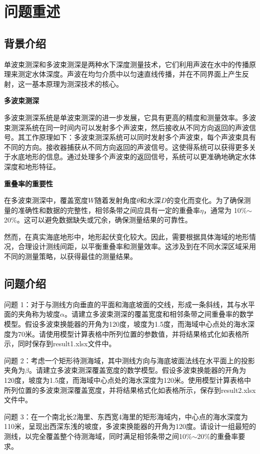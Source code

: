 \documentclass[12pt,a4paper]{article}
\begin{document}
	
	\section{问题重述}
\subsection{背景介绍}
	单波束测深和多波束测深是两种水下深度测量技术，它们利用声波在水中的传播原理来测定水体深度。声波在均匀介质中以匀速直线传播，并在不同界面上产生反射，这一基本原理为测深技术的核心。
	
	\noindent\textbf{多波束测深}
	
	多波束测深系统是单波束测深的进一步发展，它具有更高的精度和测量效率。多波束测深系统在同一时间内可以发射多个声波束，然后接收从不同方向返回的声波信号。其工作原理如下：多波束测深系统可以同时发射多个声波束，每个声波束具有不同的方向。接收器捕获从不同方向返回的声波信号。这使得系统可以获得更多关于水底地形的信息。通过处理多个声波束的返回信号，系统可以更准确地确定水体深度和地形特征。
	
	\noindent\textbf{重叠率的重要性}
	
	在多波束测深中，覆盖宽度$W$随着发射角度$\theta$和水深$D$的变化而变化。为了确保测量的准确性和数据的完整性，相邻条带之间应具有一定的重叠率$\eta$，通常为 10\%$\sim$20\%。这可以避免数据缺失或冗余，确保测量结果的可靠性。
	
	然而，在真实海底地形中，地形起伏变化较大。因此，需要根据具体海域的地形情况，合理设计测线间距，以平衡重叠率和测量效率。这涉及到在不同水深区域采用不同的测量策略，以获得最佳的测量结果。
	
	\subsection{问题介绍}
	问题 1：对于与测线方向垂直的平面和海底坡面的交线，形成一条斜线，其与水平面的夹角称为坡度$\alpha$。请建立多波束测深的覆盖宽度和相邻条带之间重叠率的数学模型。假设多波束换能器的开角为120度，坡度为1.5度，而海域中心点处的海水深度为70米。请使用模型计算表格中所列位置的参数值，并将结果格式化如表格所示，同时保存到result1.xlsx文件中。
	
	问题 2：考虑一个矩形待测海域，其中测线方向与海底坡面法线在水平面上的投影夹角为$\beta$。请建立多波束测深覆盖宽度的数学模型。假设多波束换能器的开角为120度，坡度为1.5度，而海域中心点处的海水深度为120米。使用模型计算表格中所列位置的多波束测深覆盖宽度，并将结果格式化如表格所示，保存到result2.xlsx文件中。
	
	问题 3：在一个南北长2海里、东西宽4海里的矩形海域内，中心点的海水深度为110米，呈现出西深东浅的坡度，多波束换能器的开角为120度。请设计一组最短的测线，以完全覆盖整个待测海域，同时满足相邻条带之间10\%$\sim$20\%的重叠率要求。
	
\end{document}

